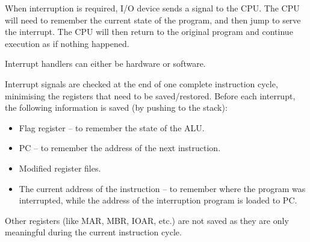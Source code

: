 When interruption is required, I/O device sends a signal to the CPU. The CPU will need to
remember the current state of the program, and then jump to serve the interrupt. The CPU
will then return to the original program and continue execution as if nothing happened.

Interrupt handlers can either be hardware or software.

Interrupt signals are checked at the end of one complete instruction cycle, minimising the
registers that need to be saved/restored. Before each interrupt, the following information
is saved (by pushing to the stack):
\begin{itemize}
    \item Flag register -- to remember the state of the ALU.
    \item PC -- to remember the address of the next instruction.
    \item Modified register files.
    \item The current address of the instruction -- to remember where the program was
        interrupted, while the address of the interruption program is loaded to PC.
\end{itemize}
Other registers (like MAR, MBR, IOAR, etc.) are not saved as they are only meaningful
during the current instruction cycle.
